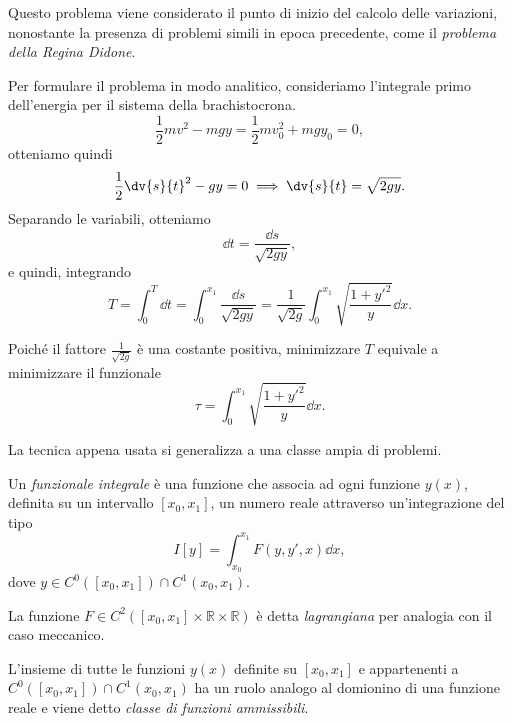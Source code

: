 Questo problema viene considerato il punto di inizio del calcolo delle variazioni, nonostante la presenza di problemi simili in epoca precedente, come il \emph{problema della Regina Didone}.

Per formulare il problema in modo analitico, consideriamo l'integrale primo dell'energia per il sistema della brachistocrona.
\begin{equation*}
    \frac{1}{2}mv^2 - mg y = \frac{1}{2}mv_0^2 + mg y_0 = 0,
\end{equation*}
otteniamo quindi
\begin{equation*}
    \frac{1}{2}\dv{s}{t}^2 - g y = 0 \implies \dv{s}{t} = \sqrt{2 g y}.
\end{equation*}
Separando le variabili, otteniamo
\begin{equation*}
    \dd{t} = \frac{\dd{s}}{\sqrt{2 g y}},
\end{equation*}
e quindi, integrando 
\begin{equation*}
    T = \int_0^T \dd{t} = \int_0^{x_1} \frac{\dd{s}}{\sqrt{2 g y}} = \frac{1}{\sqrt{2g}}\int_0^{x_1} \sqrt{\frac{1+y'^2}{y}}\dd{x}.
\end{equation*}

Poiché il fattore $\frac{1}{\sqrt{2g}}$ è una costante positiva, minimizzare $T$ equivale a minimizzare il funzionale
\begin{equation*}
    \tau = \int_0^{x_1} \sqrt{\frac{1+y'^2}{y}}\dd{x}.
\end{equation*}

La tecnica appena usata si generalizza a una classe ampia di problemi.

\begin{definition}
    Un \emph{funzionale integrale} è una funzione che associa ad ogni funzione $y(x)$, definita su un intervallo $[x_0, x_1]$, un numero reale attraverso un'integrazione del tipo
    \begin{equation*}
        I[y] = \int_{x_0}^{x_1} F(y, y', x)\dd{x},
    \end{equation*}
    dove $y\in C^0([x_0, x_1])\cap C^1(x_0, x_1)$.

    La funzione $F\in C^2([x_0, x_1] \times \mathbb{R} \times \mathbb{R})$ è detta \emph{lagrangiana} per analogia con il caso meccanico.
\end{definition}

L'insieme di tutte le funzioni $y(x)$ definite su $[x_0, x_1]$ e appartenenti a $C^0([x_0, x_1])\cap C^1(x_0, x_1)$ ha un ruolo analogo al domionino di una funzione reale e viene detto \emph{classe di funzioni ammissibili}.

